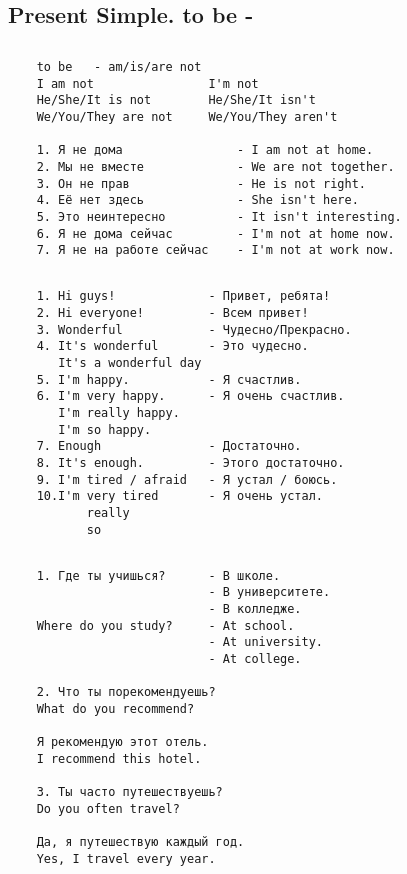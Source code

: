 \subsection{Present Simple. to be -}
\subsection*{}
\begin{verbatim}
    to be   - am/is/are not
    I am not                I'm not
    He/She/It is not        He/She/It isn't
    We/You/They are not     We/You/They aren't

    1. Я не дома                - I am not at home.
    2. Мы не вместе             - We are not together.
    3. Он не прав               - He is not right.
    4. Её нет здесь             - She isn't here.
    5. Это неинтересно          - It isn't interesting.
    6. Я не дома сейчас         - I'm not at home now.
    7. Я не на работе сейчас    - I'm not at work now.
\end{verbatim}

\subsection*{}
\begin{verbatim}
    1. Hi guys!             - Привет, ребята!
    2. Hi everyone!         - Всем привет!
    3. Wonderful            - Чудесно/Прекрасно.
    4. It's wonderful       - Это чудесно.
       It's a wonderful day
    5. I'm happy.           - Я счастлив.
    6. I'm very happy.      - Я очень счастлив.
       I'm really happy.
       I'm so happy.
    7. Enough               - Достаточно.
    8. It's enough.         - Этого достаточно.
    9. I'm tired / afraid   - Я устал / боюсь.
    10.I'm very tired       - Я очень устал.
           really
           so
\end{verbatim}

\subsection*{}
\begin{verbatim}
    1. Где ты учишься?      - В школе.
                            - В университете.
                            - В колледже.
    Where do you study?     - At school.
                            - At university.
                            - At college.
    
    2. Что ты порекомендуешь?
    What do you recommend?

    Я рекомендую этот отель.
    I recommend this hotel.

    3. Ты часто путешествуешь?
    Do you often travel?

    Да, я путешествую каждый год.
    Yes, I travel every year.
\end{verbatim}

